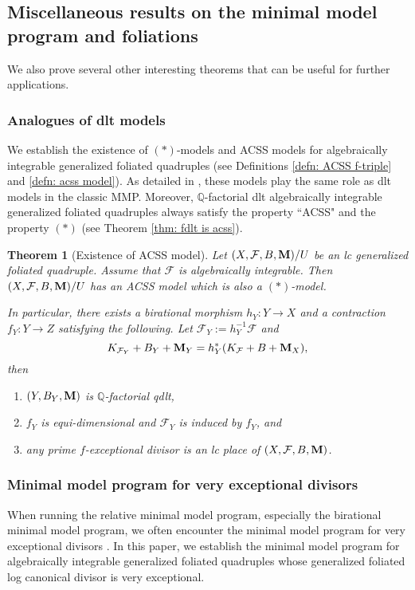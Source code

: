 \documentclass[11pt]{amsart}
\numberwithin{equation}{section}
\newcommand{\Mm}{{\bf{M}}}
\newcommand{\Qq}{\mathbb{Q}}
\newcommand{\Ff}{\mathcal{F}}
\newtheorem{thm}{Theorem}[subsection]
\theoremstyle{definition}
\theoremstyle{definition}
\theoremstyle{definition}
\begin{document}
\subsection{Miscellaneous results on the minimal model program and foliations} We also prove several other interesting theorems that can be useful for further applications.

\subsubsection{Analogues of dlt models} We establish the existence of $(*)$-models and ACSS models for algebraically integrable generalized foliated quadruples (see Definitions \ref{defn: ACSS f-triple} and \ref{defn: acss model}). As detailed in \cite{ACSS21,CS23a,DLM23}, these models play the same role as dlt models in the classic MMP. Moreover, $\Qq$-factorial dlt algebraically integrable generalized foliated quadruples always satisfy the property ``ACSS" and the property $(*)$ (see Theorem \ref{thm: fdlt is acss}).

\begin{thm}[Existence of ACSS model]\label{thm:  ACSS model}
    Let $(X,\Ff,B,\Mm)/U$ be an lc generalized foliated quadruple. Assume that $\Ff$ is algebraically integrable. Then $(X,\Ff,B,\Mm)/U$ has an ACSS model which is also a $(*)$-model.
    
    In particular, there exists a birational morphism $h_Y: Y\rightarrow X$ and a contraction $f_Y: Y\rightarrow Z$ satisfying the following. Let $\Ff_Y:=h_Y^{-1}\Ff$ and
    $$K_{\Ff_Y}+B_Y+\Mm_Y=h_Y^*(K_{\Ff}+B+\Mm_X),$$
    then
    \begin{enumerate}
        \item  $(Y,B_Y,\Mm)$ is $\Qq$-factorial qdlt, 
        \item $f_Y$ is equi-dimensional and $\Ff_Y$ is induced by $f_Y$, and
        \item any prime $f$-exceptional divisor is an lc place of $(X,\Ff,B,\Mm)$.
    \end{enumerate}
\end{thm}

\subsubsection{Minimal model program for very exceptional divisors} When running the relative minimal model program, especially the birational minimal model program, we often encounter the minimal model program for very exceptional divisors \cite[Theorem 1.8]{Bir12}. In this paper, we establish the minimal model program for algebraically integrable generalized foliated quadruples whose generalized foliated log canonical divisor is very exceptional. 
\end{document}
